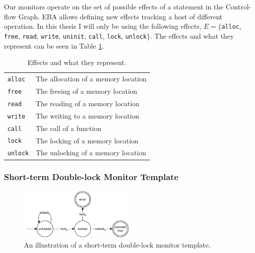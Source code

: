 \newpar Our monitors operate on the set of possible effects of a statement in the Control-flow Graph. EBA allows defining new effects tracking a host of different operation. In this thesis I will only be using the following effects, $E = \{$\texttt{alloc}, \texttt{free}, \texttt{read}, \texttt{write}, \texttt{uninit}, \texttt{call}, \texttt{lock}, \texttt{unlock}$\}$. The effects and what they represent can be seen in Table \ref{effect-table}.

\begin{table}[H]
    \centering
    \begin{tabular}{ll}
        \texttt{alloc}  & The allocation of a memory location                   \\
        \texttt{free}   & The freeing of a memory location                      \\
        \texttt{read}   & The reading of a memory location                      \\
        \texttt{write}  & The writing to a memory location                      \\
        \texttt{call}   & The call of a function                                \\
        \texttt{lock}   & The locking of a memory location                      \\
        \texttt{unlock} & The unlocking of a memory location    
    \end{tabular}
    \caption{Effects and what they represent.}
    \label{effect-table}
\end{table}

\subsubsection*{Short-term Double-lock Monitor Template}

\begin{figure}[H]
    \centering
    \includegraphics[width=0.5\textwidth]{algorithm/figures/double-lock-short-term}
    \caption{An illustration of a short-term double-lock monitor template.}
    \label{double-lock-automata-short-term}
\end{figure}

